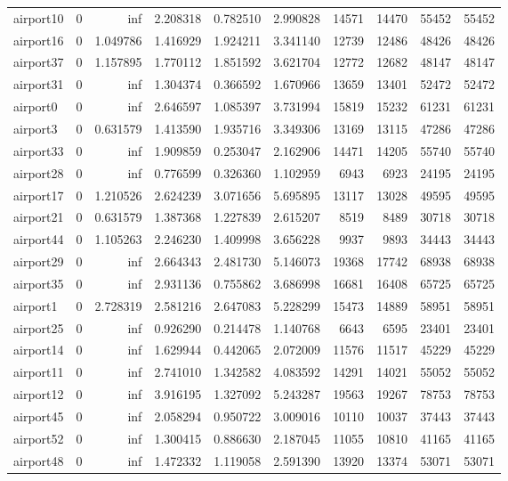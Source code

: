 \begin{longtable}{|l|r|r|r|r|r|r|r|r|r|}
airport10 & 0 & inf & 2.208318 & 0.782510 & 2.990828 & 14571 & 14470 & 55452 & 55452 \\
airport16 & 0 & 1.049786 & 1.416929 & 1.924211 & 3.341140 & 12739 & 12486 & 48426 & 48426 \\
airport37 & 0 & 1.157895 & 1.770112 & 1.851592 & 3.621704 & 12772 & 12682 & 48147 & 48147 \\
airport31 & 0 & inf & 1.304374 & 0.366592 & 1.670966 & 13659 & 13401 & 52472 & 52472 \\
airport0 & 0 & inf & 2.646597 & 1.085397 & 3.731994 & 15819 & 15232 & 61231 & 61231 \\
airport3 & 0 & 0.631579 & 1.413590 & 1.935716 & 3.349306 & 13169 & 13115 & 47286 & 47286 \\
airport33 & 0 & inf & 1.909859 & 0.253047 & 2.162906 & 14471 & 14205 & 55740 & 55740 \\
airport28 & 0 & inf & 0.776599 & 0.326360 & 1.102959 & 6943 & 6923 & 24195 & 24195 \\
airport17 & 0 & 1.210526 & 2.624239 & 3.071656 & 5.695895 & 13117 & 13028 & 49595 & 49595 \\
airport21 & 0 & 0.631579 & 1.387368 & 1.227839 & 2.615207 & 8519 & 8489 & 30718 & 30718 \\
airport44 & 0 & 1.105263 & 2.246230 & 1.409998 & 3.656228 & 9937 & 9893 & 34443 & 34443 \\
airport29 & 0 & inf & 2.664343 & 2.481730 & 5.146073 & 19368 & 17742 & 68938 & 68938 \\
airport35 & 0 & inf & 2.931136 & 0.755862 & 3.686998 & 16681 & 16408 & 65725 & 65725 \\
airport1 & 0 & 2.728319 & 2.581216 & 2.647083 & 5.228299 & 15473 & 14889 & 58951 & 58951 \\
airport25 & 0 & inf & 0.926290 & 0.214478 & 1.140768 & 6643 & 6595 & 23401 & 23401 \\
airport14 & 0 & inf & 1.629944 & 0.442065 & 2.072009 & 11576 & 11517 & 45229 & 45229 \\
airport11 & 0 & inf & 2.741010 & 1.342582 & 4.083592 & 14291 & 14021 & 55052 & 55052 \\
airport12 & 0 & inf & 3.916195 & 1.327092 & 5.243287 & 19563 & 19267 & 78753 & 78753 \\
airport45 & 0 & inf & 2.058294 & 0.950722 & 3.009016 & 10110 & 10037 & 37443 & 37443 \\
airport52 & 0 & inf & 1.300415 & 0.886630 & 2.187045 & 11055 & 10810 & 41165 & 41165 \\
airport48 & 0 & inf & 1.472332 & 1.119058 & 2.591390 & 13920 & 13374 & 53071 & 53071 \\

\end{longtable}
